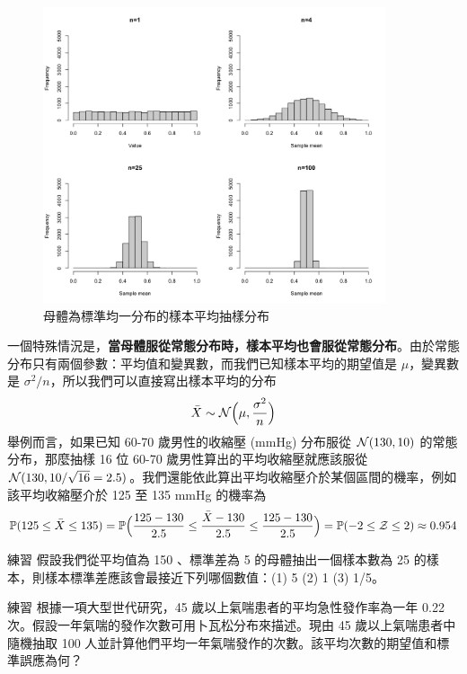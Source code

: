     \begin{figure}[htbp]
        \centering
        \includegraphics[width=0.9\textwidth]{figures/04-Sampling_distribution_CLT/mean_dist_unif.png}
        \caption{母體為標準均一分布的樣本平均抽樣分布}
        \label{fig:mean_dist_unif}
    \end{figure}

    一個特殊情況是，\textbf{當母體服從常態分布時，樣本平均也會服從常態分布}。由於常態分布只有兩個參數：平均值和變異數，而我們已知樣本平均的期望值是 $\mu$，變異數是 $\sigma^2/n$，所以我們可以直接寫出樣本平均的分布
    \[\bar{X} \sim \mathcal{N}\Big(\mu, \frac{\sigma^2}{n}\Big)\]
    舉例而言，如果已知 60-70 歲男性的收縮壓 (mmHg) 分布服從 $\mathcal{N}(130, 10)$ 的常態分布，那麼抽樣 16 位 60-70 歲男性算出的平均收縮壓就應該服從 $\mathcal{N}(130, 10/\sqrt{16} = 2.5)$。我們還能依此算出平均收縮壓介於某個區間的機率，例如該平均收縮壓介於 125 至 135 mmHg 的機率為
    \[\mathbb{P}(125 \le \bar{X} \le 135) = \mathbb{P}\Big(\frac{125-130}{2.5} \le \frac{\bar{X}-130}{2.5} \le \frac{125-130}{2.5}\Big) = \mathbb{P}(-2 \le \mathcal{Z} \le 2) \approx 0.954\]
    
    \bigskip

    \begin{custom}{練習}
        假設我們從平均值為 150 、標準差為 5 的母體抽出一個樣本數為 25 的樣本，則樣本標準差應該會最接近下列哪個數值：(1) 5 (2) 1 (3) 1/5。
    \end{custom}

    \bigskip

    \begin{custom}{練習}
        根據一項大型世代研究，45 歲以上氣喘患者的平均急性發作率為一年 0.22 次。假設一年氣喘的發作次數可用卜瓦松分布來描述。現由 45 歲以上氣喘患者中隨機抽取 100 人並計算他們平均一年氣喘發作的次數。該平均次數的期望值和標準誤應為何？
    \end{custom}

